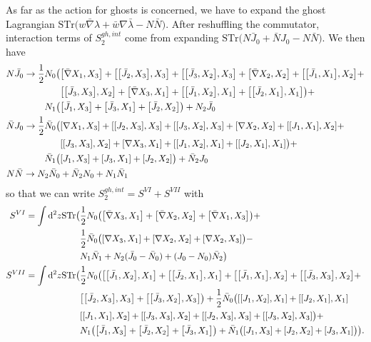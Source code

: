 \documentclass[12pt]{article}
\def\be{\begin{equation}}
\def\ee{\end{equation}}
\numberwithin{equation}{section}
\begin{document}
As far as the action for ghosts is concerned, we have to expand the ghost Lagrangian $\text{STr}\big(w\bar{\nabla}\lambda + \bar{w}\nabla \bar{\lambda} - N\bar{N}\big)$. After reshuffling the commutator, interaction terms of $S_2^{gh, int}$ come from expanding $\text{STr}\big(N \bar{J}_0 + \bar{N} J_0 - N\bar{N}\big)$. We then have
{\allowdisplaybreaks
\begin{align}
	N \bar{J}_0 \to \frac{1}{2}N_0\big(&\comm{\bar{\nabla} X_1}{X_3} + \comm{\comm{\bar{J}_2}{X_3}}{X_3} + \comm{\comm{\bar{J}_3}{X_2}}{X_3} + \comm{\bar{\nabla} X_2}{X_2} +  \comm{\comm{\bar{J}_1}{X_1}}{X_2} + \nonumber \\& \comm{\comm{\bar{J}_3}{X_3}}{X_2} + \comm{\bar{\nabla} X_3}{X_1} + \comm{\comm{\bar{J}_1}{X_2}}{X_1} + \comm{\comm{\bar{J}_2}{X_1}}{X_1}\big) + \nonumber \\
	N_1\big(&\comm{\bar{J}_1}{X_3} + \comm{\bar{J}_3}{X_1} + \comm{\bar{J}_2}{X_2} \big) +	N_2 \bar{J}_0 \nonumber \\
	\bar{N} J_0 \to \frac{1}{2}\bar{N}_0\big(&\comm{\nabla X_1}{X_3} + \comm{\comm{J_2}{X_3}}{X_3} + \comm{\comm{J_3}{X_2}}{X_3} + \comm{\nabla X_2}{X_2} +  \comm{\comm{J_1}{X_1}}{X_2} + \nonumber \\& \comm{\comm{J_3}{X_3}}{X_2} + \comm{\nabla X_3}{X_1} + \comm{\comm{J_1}{X_2}}{X_1} + \comm{\comm{J_2}{X_1}}{X_1}\big) + \nonumber \\
	\bar{N}_1\big(&\comm{J_1}{X_3} + \comm{J_3}{X_1} + \comm{J_2}{X_2} \big) +	\bar{N}_2 J_0 \nonumber \\
	N\bar{N} \to N_2 \bar{N}_0& + \bar{N}_2 N_0 + N_1 \bar{N}_1
\end{align}
}
so that we can write $S_2^{gh, int} = S^{VI} + S^{VII}$ with
\be
\begin{aligned}
	S^{VI} = \int \dd^2z\text{STr}\big(& \frac{1}{2}N_0\big(\comm{\bar{\nabla} X_3}{X_1} + \comm{\bar{\nabla}X_2}{X_2} + \comm{\bar{\nabla}X_1}{X_3}\big) + \\
						       &\frac{1}{2}\bar{N}_0\big(\comm{\nabla X_3}{X_1} + \comm{\nabla X_2}{X_2} + \comm{\nabla X_2}{X_3}\big) - \\
						       & N_1 \bar{N}_1 + N_2(\bar{J}_0 - \bar{N}_0) + (J_0 - N_0)\bar{N}_2\big) \\
		S^{VII} = \int\dd^2z \text{STr}\big(&\frac{1}{2} N_0 \big(\comm{\comm{\bar{J}_1}{X_2}}{X_1} + \comm{\comm{\bar{J}_2}{X_1}}{X_1} + \comm{\comm{\bar{J}_1}{X_1}}{X_2} + \comm{\comm{\bar{J}_3}{X_3}}{X_2} + \\
								 & \comm{\comm{\bar{J}_2}{X_3}}{X_3} + \comm{\comm{\bar{J}_3}{X_2}}{X_3} \big)+ \frac{1}{2}\bar{N}_0\big(\comm{\comm{J_1}{X_2}}{X_1} + \comm{\comm{J_2}{X_1}}{X_1} \\ &
						 \comm{\comm{J_1}{X_1}}{X_2} + \comm{\comm{J_3}{X_3}}{X_2} + \comm{\comm{J_2}{X_3}}{X_3} + \comm{\comm{J_3}{X_2}}{X_3}\big)+ \\
								 & N_1\big(\comm{\bar{J}_1}{X_3} + \comm{\bar{J}_2}{X_2} + \comm{\bar{J}_3}{X_1}\big) + \bar{N}_1\big(\comm{J_1}{X_3} + \comm{J_2}{X_2} + \comm{J_3}{X_1}\big)\big).
\label{exp2}
\end{aligned}
\ee
\end{document}
